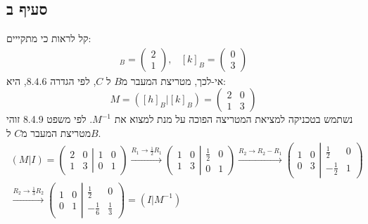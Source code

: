 \documentclass{article}
\begin{document}
\subsection*{סעיף ב}

קל לראות כי מתקייים:
\begin{align*}
    [h]_B = \begin{pmatrix}
        2 \\
        1
    \end{pmatrix}, &
    [k]_B=\begin{pmatrix}
        0 \\
        3
    \end{pmatrix}
\end{align*}
אי-לכך, מטריצת המעבר מ$B$ ל $C$, לפי הגדרה $8.4.6$, היא:
\[
    M=([h]_B | [k]_B)=\begin{pmatrix}
        2 & 0 \\
        1 & 3
    \end{pmatrix}
\]
נשתמש בטכניקה למציאת המטריצה הפוכה על מנת למצוא את $M^{-1}$. לפי משפט 8.4.9 זוהי מטריצת המעבר מ$C$ ל$B$.
\begin{align*}
    (M | I) =
    \left(
    \begin{matrix}
            2 & 0 \\
            1 & 3
        \end{matrix}
    \left|
    \begin{matrix}
            1 & 0 \\
            0 & 1
        \end{matrix}
    \right.
    \right)
    \xrightarrow{R_1\rightarrow \frac{1}{2}R_1}
    \left(
    \begin{matrix}
            1 & 0 \\
            1 & 3
        \end{matrix}
    \left|
    \begin{matrix}
            \frac{1}{2} & 0 \\
            0           & 1
        \end{matrix}
    \right.
    \right)
    \xrightarrow{R_2\rightarrow R_2-R_1}
    \left(
    \begin{matrix}
            1 & 0 \\
            0 & 3
        \end{matrix}
    \left|
    \begin{matrix}
            \frac{1}{2}  & 0 \\
            -\frac{1}{2} & 1
        \end{matrix}
    \right.
    \right) \\
    \xrightarrow{R_2\rightarrow \frac{1}{3}R_2}
    \left(
    \begin{matrix}
            1 & 0 \\
            0 & 1
        \end{matrix}
    \left|
    \begin{matrix}
            \frac{1}{2}  & 0           \\
            -\frac{1}{6} & \frac{1}{3}
        \end{matrix}
    \right.
    \right) =
    (I | M^{-1})
\end{align*}
\end{document}
